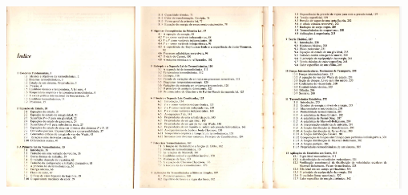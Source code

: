 \documentclass[t,%
brazilian,%
11pt,%
aspectratio=169,%
table%
]{beamer}
\begin{document}
\begin{frame}
    \centering
    \includegraphics[width=0.32\textwidth]{images/Captura de tela de 2023-03-27 07-48-56.png}
    \includegraphics[width=0.32\textwidth]{images/Captura de tela de 2023-03-27 07-49-06.png}
    \includegraphics[width=0.32\textwidth]{images/Captura de tela de 2023-03-27 07-49-18.png}
\end{frame}

\end{document}
